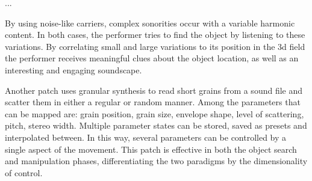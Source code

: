 \documentclass{nime-alternate}
\begin{document}
...


By using noise-like carriers, complex sonorities occur with a variable harmonic content. In both cases, the performer tries to find the object by listening to these variations. By correlating small and large variations to its position in the 3d field the performer receives meaningful clues about the object location, as well as an interesting and engaging soundscape. 

Another patch uses granular synthesis to
read short grains from a sound file and scatter them in either a regular or random manner. Among the parameters that can be mapped are: grain position, grain size, envelope shape, level of scattering, pitch, stereo width. Multiple parameter states can be stored, saved as presets and interpolated between. In this way, several parameters can be controlled by a single aspect of the movement. This patch is effective in both the object search and manipulation phases, differentiating the two paradigms by the dimensionality of control.
\end{document}
